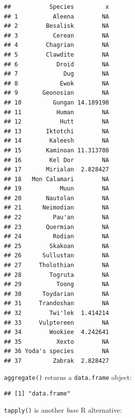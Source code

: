 \documentclass[]{gitbook}
\newenvironment{Shaded}{\begin{snugshade}}{\end{snugshade}}
\newcommand{\DataTypeTok}[1]{\textcolor[rgb]{0.13,0.29,0.53}{#1}}
\newcommand{\KeywordTok}[1]{\textcolor[rgb]{0.13,0.29,0.53}{\textbf{#1}}}
\newcommand{\NormalTok}[1]{#1}
\newcommand{\OperatorTok}[1]{\textcolor[rgb]{0.81,0.36,0.00}{\textbf{#1}}}
\theoremstyle{definition}
\theoremstyle{definition}
\theoremstyle{definition}
\theoremstyle{remark}
\begin{document}
\begin{verbatim}
##           Species         x
## 1          Aleena        NA
## 2        Besalisk        NA
## 3          Cerean        NA
## 4        Chagrian        NA
## 5        Clawdite        NA
## 6           Droid        NA
## 7             Dug        NA
## 8            Ewok        NA
## 9       Geonosian        NA
## 10         Gungan 14.189198
## 11          Human        NA
## 12           Hutt        NA
## 13       Iktotchi        NA
## 14        Kaleesh        NA
## 15       Kaminoan 11.313708
## 16        Kel Dor        NA
## 17       Mirialan  2.828427
## 18   Mon Calamari        NA
## 19           Muun        NA
## 20       Nautolan        NA
## 21      Neimodian        NA
## 22         Pau'an        NA
## 23       Quermian        NA
## 24         Rodian        NA
## 25        Skakoan        NA
## 26      Sullustan        NA
## 27     Tholothian        NA
## 28        Togruta        NA
## 29          Toong        NA
## 30      Toydarian        NA
## 31     Trandoshan        NA
## 32        Twi'lek  1.414214
## 33     Vulptereen        NA
## 34        Wookiee  4.242641
## 35          Xexto        NA
## 36 Yoda's species        NA
## 37         Zabrak  2.828427
\end{verbatim}

\texttt{aggregate()} returns a \texttt{data.frame} object:

\begin{Shaded}
\end{Shaded}

\begin{verbatim}
## [1] "data.frame"
\end{verbatim}

\texttt{tapply()} is another \emph{base} R alternative:

\begin{Shaded}
\end{Shaded}
\end{document}
